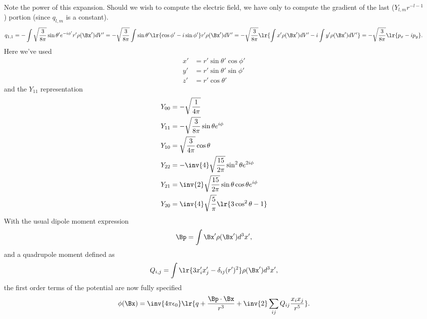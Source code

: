 %
Note the power of this expansion.  Should we wish to compute the electric field, we have only to compute the gradient of  the last (\(Y_{l,m} r^{-l-1} \)) portion (since \( q_{l,m} \) is a constant).
%
\begin{dmath}\label{eqn:emtLecture8:520}
q_{1,1}
=
-\int \sqrt{\frac{3}{8 \pi}} \sin\theta' e^{-i\phi'} r' \rho(\Bx') dV'
=
-\sqrt{\frac{3}{8 \pi}} \int \sin\theta' \lr{ \cos\phi' - i\sin\phi'} r' \rho(\Bx') dV'
=
-\sqrt{\frac{3}{8 \pi}} \lr{
\int x' \rho(\Bx') dV'
-i \int y' \rho(\Bx') dV'
}
=
-\sqrt{\frac{3}{8 \pi}} \lr{
p_x - i p_y
}.
\end{dmath}
%
Here we've used
\begin{equation}\label{eqn:emtLecture8:540}
\begin{aligned}
x' &= r' \sin\theta' \cos\phi' \\
y' &= r' \sin\theta' \sin\phi' \\
z' &= r' \cos\theta'
\end{aligned}
\end{equation}
%
and the \( Y_{11} \) representation
%
\begin{equation}\label{eqn:emtLecture8:560}
\begin{aligned}
Y_{00} &= -\sqrt{\frac{1}{4 \pi}} \\
Y_{11} &= -\sqrt{\frac{3}{8 \pi}} \sin\theta e^{i\phi} \\
Y_{10} &=  \sqrt{\frac{3}{4 \pi}} \cos\theta  \\
Y_{22} &= -\inv{4} \sqrt{\frac{15}{2 \pi}} \sin^2\theta e^{2 i\phi} \\
Y_{21} &=  \inv{2} \sqrt{\frac{15}{2 \pi}} \sin\theta \cos\theta e^{i\phi} \\
Y_{20} &=  \inv{4} \sqrt{\frac{5}{\pi}} \lr{ 3 \cos^2\theta - 1 } \\
\end{aligned}
\end{equation}
%
%
With the usual dipole moment expression
%
\begin{dmath}\label{eqn:emtLecture8:580}
\Bp = \int \Bx' \rho(\Bx') d^3 x',
\end{dmath}
%
and a quadrupole moment defined as
\begin{dmath}\label{eqn:emtLecture8:600}
Q_{i,j} = \int \lr{ 3 x_i' x_j' - \delta_{ij} (r')^2 } \rho(\Bx') d^3 x',
\end{dmath}
%
the first order terms of the potential are now fully specified
\begin{dmath}\label{eqn:emtLecture8:620}
\phi(\Bx)
=
\inv{4 \pi \epsilon_0}
\lr{
q + \frac{\Bp \cdot \Bx}{r^3} +
\inv{2} \sum_{ij} Q_{ij} \frac{x_i x_j}{r^5}
}.
\end{dmath}
